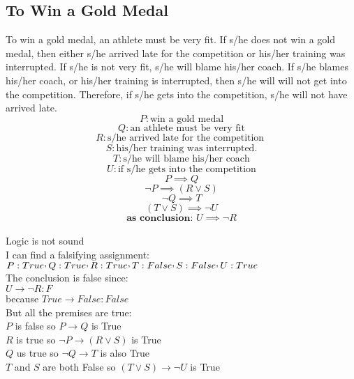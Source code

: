 \documentclass[a4paper,12pt]{article}
\newcommand{\CommaPunct}{\mathpunct{\raisebox{0.5ex}{,}}}
\begin{document}
\subsection{To Win a Gold Medal}
To win a gold medal, an athlete must be very fit.  If s/he does not win a gold medal, then either s/he arrived late for the competition or his/her training was interrupted.  If s/he is not very fit, s/he will blame his/her coach.  If s/he blames his/her coach, or his/her training is interrupted, then s/he will will not get into the competition.  Therefore, if s/he gets into the competition, s/he will not have arrived late.
\[
P: \text{win a gold medal} 
\]
\[
Q: \text{an athlete must be very fit} 
\]
\[
R: \text{s/he arrived late for the competition } 
\]
\[
S: \text{his/her training was interrupted.} 
\]
\[
T: \text{s/he will blame his/her coach}
\]
\[
U: \text{if s/he gets into the competition}
\]
\begin{equation} 
P \implies Q 
\end{equation}
\begin{equation} 
\neg P \implies (R \vee S)
\end{equation}
\begin{equation} 
\neg Q \implies T
\end{equation}
\begin{equation} 
(T \vee S ) \implies \neg U
\end{equation}
\begin{equation} 
\textbf{as conclusion: } U \implies \neg R
\end{equation}\\
Logic is not sound\\
I can find a falsifying assignment:\\
$P:True \CommaPunct Q:True \CommaPunct R:True \CommaPunct T:False \CommaPunct S:False \CommaPunct  U:True$\\
The conclusion is false since:\\
$U \rightarrow \lnot R : F$\\
because $True \rightarrow False : False$\\
But all the premises are true:\\
$P$ is false so $P \rightarrow Q$ is True\\
$R$ is true so $ \neg P \rightarrow(R \vee S)$ is True\\
$Q$ us true so $ \neg Q \rightarrow T $ is also True\\
$T$ and $S$ are both False so $ (T \vee S) \rightarrow \lnot U$ is True\\
\end{document}
